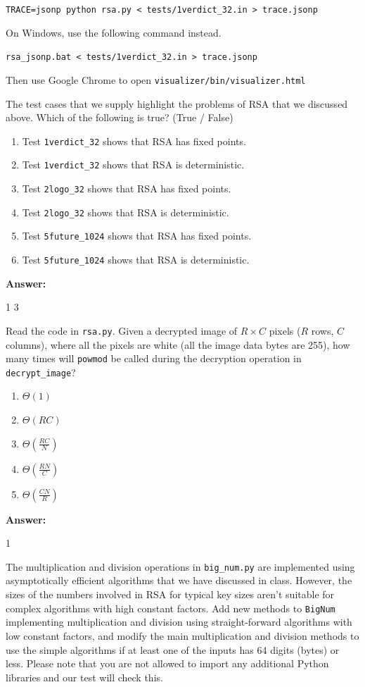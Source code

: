 \documentclass[12pt,twoside]{article}
\newcommand{\answer}{
 \par\medskip
 \textbf{Answer:}
}
\newcommand{\answerIIIe}{ \answer
1 3
}
\newcommand{\answerIIIf}{ \answer
1
}
\begin{document}
\begin{problems}
\texttt{TRACE=jsonp python rsa.py < tests/1verdict\_32.in > trace.jsonp}

On Windows, use the following command instead.

\texttt{rsa\_jsonp.bat < tests/1verdict\_32.in > trace.jsonp}

Then use Google Chrome to open
\texttt{visualizer/bin/visualizer.html}

\begin{problemparts}
\problempart {} The test cases that we supply highlight the problems of
RSA that we discussed above. Which of the following is true? (True / False)
\begin{enumerate}
  \item Test \texttt{1verdict\_32} shows that RSA has fixed points.
  \item Test \texttt{1verdict\_32} shows that RSA is deterministic.
  \item Test \texttt{2logo\_32} shows that RSA has fixed points.
  \item Test \texttt{2logo\_32} shows that RSA is deterministic.
  \item Test \texttt{5future\_1024} shows that RSA has fixed points.
  \item Test \texttt{5future\_1024} shows that RSA is deterministic.
\end{enumerate}
\answerIIIe

\problempart {} Read the code in \texttt{rsa.py}. Given a decrypted
image of $R \times C$ pixels ($R$ rows, $C$ columns), where all the pixels
are white (all the image data bytes are 255), how many times will
\texttt{powmod} be called during the decryption operation in
\texttt{decrypt\_image}?
\begin{enumerate}
  \item $\Theta(1)$
  \item $\Theta(R C)$
  \item $\Theta(\frac{RC}{N})$
  \item $\Theta(\frac{RN}{C})$
  \item $\Theta(\frac{CN}{R})$
\end{enumerate}
\answerIIIf

\problempart {} The multiplication and division operations in
\texttt{big\_num.py} are implemented using asymptotically efficient algorithms
that we have discussed in class. However, the sizes of the numbers involved in
RSA for typical key sizes aren't suitable for complex algorithms with high
constant factors. Add new methods to \texttt{BigNum} implementing multiplication
and division using straight-forward algorithms with low constant factors, and
modify the main multiplication and division methods to use the simple algorithms
if at least one of the inputs has 64 digits (bytes) or less. Please note that
you are not allowed to import any additional Python libraries and our test will
check this.
\end{problemparts}


\end{problems}
\end{document}
